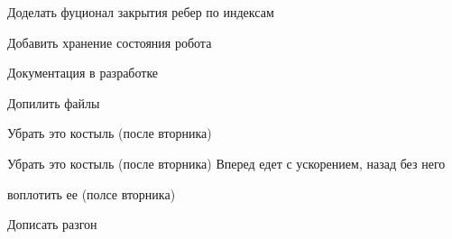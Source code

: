 
\begin{DoxyRefList}
\item[Группа \mbox{\hyperlink{group__edge}{edge}} ]\label{todo__todo000001}%
%
Доделать фуционал закрытия ребер по индексам  
\item[Класс \mbox{\hyperlink{struct_field}{Field}} ]\label{todo__todo000002}%
%
Добавить хранение состояния робота 

Документация в разработке  
\item[Файл \mbox{\hyperlink{file_8h}{file.h}} ]\label{todo__todo000003}%
%
Допилить файлы  
\item[Член \mbox{\hyperlink{group__line_gaa1ef32768cc6e595d0a6b1b93198ad43}{line}} (int speed, int dist, int type)]\label{todo__todo000004}%
%
Убрать это костыль (после вторника)  
\item[Член \mbox{\hyperlink{group__motors_ga7c52089e1da288007eb28bfe32479c29}{move\+BC}} (int s, int dist, bool stop=true)]\label{todo__todo000006}%
%
Убрать это костыль (после вторника) Вперед едет с ускорением, назад без него  
\item[Член \mbox{\hyperlink{group__motors_ga2789eedb3418d0a45362184e07127b5d}{move\+BCNEW}} (\mbox{\hyperlink{struct_speed}{Speed}} p, int dist, bool stop=true)]\label{todo__todo000005}%
%
воплотить ее (полсе вторника)  
\item[Группа \mbox{\hyperlink{group__turn}{turn}} ]\label{todo__todo000007}%
%
Дописать разгон 
\end{DoxyRefList}
